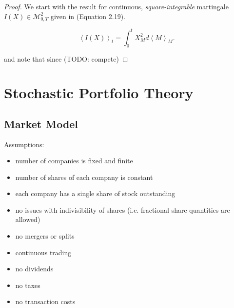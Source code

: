 \documentclass[british]{amsart}
\numberwithin{equation}{section}
\numberwithin{figure}{section}
\theoremstyle{plain}
\theoremstyle{definition}
\theoremstyle{plain}
\theoremstyle{plain}
\theoremstyle{plain}
\theoremstyle{remark}
\theoremstyle{plain}
\newcommand{\msquared}{\mathcal{M}^{2}_{0,T}}
\newcommand{\filtration}[1]{\mathcal{F_{#1}}}
\begin{document}
\begin{proof}
	We start with the result for continuous, \textit{square-integrable} martingale 
	$I(X) \in \msquared$ given in \cite{shreve2012} (Equation 2.19).

	\begin{equation*}
		\left<I(X)\right>_{t} = \int_{0}^{t} X_{M}^2 d\left<M\right>_{M}.
	\end{equation*}

	and note that since (TODO: compete)
\end{proof}


\newcommand{\abs}[1]{\mathop{|{#1}|}}
\newcommand{\market}{\mathcal{M}}
\newcommand{\rangei}{i=1,\dots,n}
\newcommand{\measure}{\mathbb{P}}
\newcommand{\probabilityspace}{(\Omega,\filtration,\measure)}

\section{Stochastic Portfolio Theory}

\subsection{Market Model}

Assumptions:
\begin{itemize}
	\item number of companies is fixed and finite
	\item number of shares of each company is constant
	\item each company has a single share of stock outstanding
	\item no issues with indivisibility of shares (i.e. fractional share 
				quantities are allowed)
	\item no mergers or splits
	\item continuous trading
	\item no dividends
	\item no taxes
	\item no transaction costs
\end{itemize}
\end{document}
